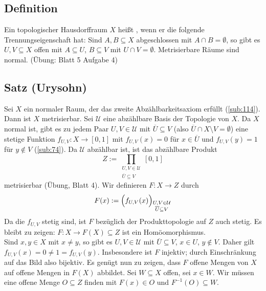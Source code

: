 \subsection[Definition: Normaler Hausdorffraum]{Definition} %
\label{sub:72}
Ein topologischer Hausdorffraum $X$ heißt , wenn er die folgende Trennungseigenschaft hat: Sind $A,B \subseteq X$ abgeschlossen mit
$A \cap B = \emptyset$, so gibt es $U,V \subseteq X$ offen mit $A \subseteq U$, $B \subseteq V$ mit $U \cap V = \emptyset$.
Metrisierbare Räume sind normal. \hfill (Übung: Blatt 5 Aufgabe 4) 

\subsection{Satz (Urysohn)} %
\label{sub:73}
Sei $X$ ein normaler Raum, der das zweite Abzählbarkeitsaxiom erfüllt (\ref{sub:114}). Dann ist $X$ metrisierbar.
Sei $\mathcal{U}$ eine abzählbare Basis der Topologie von $X$. Da $X$ normal ist, gibt es zu jedem Paar $U,V \in \mathcal{U}$ mit $\overline{U} \subseteq V $ (also
$\overline{U} \cap X \setminus V = \emptyset $) eine stetige Funktion $f_{U,V} : X \to [0,1]$ mit $f_{U,V} (x) = 0$ für $x \in \overline{U}$ und
$f_{U,V}(y) = 1$ für $y \not\in V$ (\ref{sub:74}). Da $\mathcal{U}$ abzählbar ist, ist das abzählbare Produkt 
\[
	Z := \prod_{\substack{U,V \in \mathcal{U} \\ \overline{U} \subseteq V}} [0,1]
\]
metrisierbar (Übung, Blatt 4).
Wir definieren $F : X \to Z$ durch
\[
	F(x) := \enbrace[\Big]{f_{U,V}(x)}_{\substack{U,V \in \mathcal{U} \\ \overline{U} \subseteq V}} 
\]
Da die $f_{U,V}$ stetig sind, ist $F$ bezüglich der Produkttopologie auf $Z$ auch stetig. Es bleibt zu zeigen: $F : X \to F(X) \subseteq Z$ ist ein Homöomorphismus.\smallskip \\
Sind $x,y \in X$ mit $x \not= y$, so gibt es $U,V \in \mathcal{U}$ mit $\overline{U} \subseteq V$, $x \in U$, $y \not\in V$. Daher gilt $f_{U,V} (x) = 0 \not= 1 = f_{U,V}(y)$.
Insbesondere ist $F$ injektiv; durch Einschränkung auf das Bild also bijektiv. Es genügt nun zu zeigen, dass $F$ offene Mengen von $X$ auf offene Mengen in $F(X)$ abbildet.
Sei $W \subseteq X$ offen, sei $x \in W$. Wir müssen eine offene Menge $O \subseteq Z$ finden mit $F(x) \in O$ und $F ^{-1}(O) \subseteq W$.

